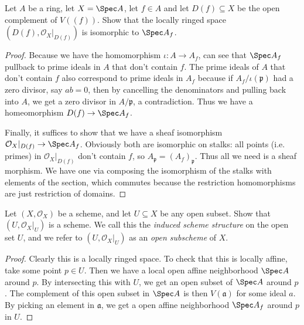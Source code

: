 \begin{exercise}
	Let $A $ be a ring, let $X = \Spec A $, let $f \in A $ and let $D(f) \subseteq X $ be the open complement of $V((f)) $. Show that the locally ringed space $(D(f),\mathcal{O}_X|_{D(f)}) $ is isomorphic to $\Spec A_f $.
\end{exercise}
\begin{proof}
	Because we have the homomorphism $\iota: A \to A_f $, can see that $\Spec A_f $ pullback to prime ideals in $A $ that don't contain $f $.
	The prime ideals of $A $ that don't contain $f $ also correspond to prime ideals in $A_f $ because if $A_f / \iota(\mathfrak{p})$ had a zero divisor, say $ab = 0 $, then by cancelling the denominators and pulling back into $A $, we get a zero divisor in $A / \mathfrak{p} $, a contradiction.
	Thus we have a homeomorphism $D(f) \to \Spec A_f $.

	Finally, it suffices to show that we have a sheaf isomorphism $\mathcal{O}_X|_{D(f)}\to \Spec A_f $.
	Obviously both are isomorphic on stalks: all points (i.e. primes) in $\mathcal{O}_X|_{D(f)} $ don't contain $f $, so $A_{\mathfrak{p}} = (A_f)_{\mathfrak{p}}$.
	Thus all we need is a sheaf morphism.
	We have one via composing the isomorphism of the stalks with elements of the section, which commutes because the restriction homomorphisms are just restriction of domains.
\end{proof}

\begin{exercise}
	Let $(X, \mathcal{O}_X) $ be a scheme, and let $U \subseteq X $ be any open subset. Show that $(U, \mathcal{O}_X|_U)$ is a scheme. We call this the \textit{induced scheme structure} on the open set $U $, and we refer to $(U, \mathcal{O}_X|_U) $ as an \textit{open subscheme} of $X $.
\end{exercise}
\begin{proof}
	Clearly this is a locally ringed space.
	To check that this is locally affine, take some point $p \in U $.
	Then we have a local open affine neighborhood $\Spec A $ around $p $.
	By intersecting this with $U $, we get an open subset of $\Spec A $ around $p $.
	The complement of this open subset in $\Spec A $ is then $V(\mathfrak{a}) $ for some ideal $a $.
	By picking an element in $\mathfrak{a} $, we get a open affine neighborhood $\Spec A_f $ around $p $ in $U $.
\end{proof}

